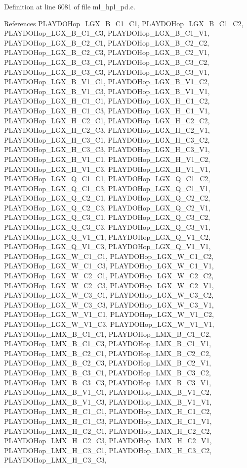 Definition at line 6081 of file ml\_\-hpl\_\-pd.c.

References PLAYDOHop\_\-LGX\_\-B\_\-C1\_\-C1, PLAYDOHop\_\-LGX\_\-B\_\-C1\_\-C2, PLAYDOHop\_\-LGX\_\-B\_\-C1\_\-C3, PLAYDOHop\_\-LGX\_\-B\_\-C1\_\-V1, PLAYDOHop\_\-LGX\_\-B\_\-C2\_\-C1, PLAYDOHop\_\-LGX\_\-B\_\-C2\_\-C2, PLAYDOHop\_\-LGX\_\-B\_\-C2\_\-C3, PLAYDOHop\_\-LGX\_\-B\_\-C2\_\-V1, PLAYDOHop\_\-LGX\_\-B\_\-C3\_\-C1, PLAYDOHop\_\-LGX\_\-B\_\-C3\_\-C2, PLAYDOHop\_\-LGX\_\-B\_\-C3\_\-C3, PLAYDOHop\_\-LGX\_\-B\_\-C3\_\-V1, PLAYDOHop\_\-LGX\_\-B\_\-V1\_\-C1, PLAYDOHop\_\-LGX\_\-B\_\-V1\_\-C2, PLAYDOHop\_\-LGX\_\-B\_\-V1\_\-C3, PLAYDOHop\_\-LGX\_\-B\_\-V1\_\-V1, PLAYDOHop\_\-LGX\_\-H\_\-C1\_\-C1, PLAYDOHop\_\-LGX\_\-H\_\-C1\_\-C2, PLAYDOHop\_\-LGX\_\-H\_\-C1\_\-C3, PLAYDOHop\_\-LGX\_\-H\_\-C1\_\-V1, PLAYDOHop\_\-LGX\_\-H\_\-C2\_\-C1, PLAYDOHop\_\-LGX\_\-H\_\-C2\_\-C2, PLAYDOHop\_\-LGX\_\-H\_\-C2\_\-C3, PLAYDOHop\_\-LGX\_\-H\_\-C2\_\-V1, PLAYDOHop\_\-LGX\_\-H\_\-C3\_\-C1, PLAYDOHop\_\-LGX\_\-H\_\-C3\_\-C2, PLAYDOHop\_\-LGX\_\-H\_\-C3\_\-C3, PLAYDOHop\_\-LGX\_\-H\_\-C3\_\-V1, PLAYDOHop\_\-LGX\_\-H\_\-V1\_\-C1, PLAYDOHop\_\-LGX\_\-H\_\-V1\_\-C2, PLAYDOHop\_\-LGX\_\-H\_\-V1\_\-C3, PLAYDOHop\_\-LGX\_\-H\_\-V1\_\-V1, PLAYDOHop\_\-LGX\_\-Q\_\-C1\_\-C1, PLAYDOHop\_\-LGX\_\-Q\_\-C1\_\-C2, PLAYDOHop\_\-LGX\_\-Q\_\-C1\_\-C3, PLAYDOHop\_\-LGX\_\-Q\_\-C1\_\-V1, PLAYDOHop\_\-LGX\_\-Q\_\-C2\_\-C1, PLAYDOHop\_\-LGX\_\-Q\_\-C2\_\-C2, PLAYDOHop\_\-LGX\_\-Q\_\-C2\_\-C3, PLAYDOHop\_\-LGX\_\-Q\_\-C2\_\-V1, PLAYDOHop\_\-LGX\_\-Q\_\-C3\_\-C1, PLAYDOHop\_\-LGX\_\-Q\_\-C3\_\-C2, PLAYDOHop\_\-LGX\_\-Q\_\-C3\_\-C3, PLAYDOHop\_\-LGX\_\-Q\_\-C3\_\-V1, PLAYDOHop\_\-LGX\_\-Q\_\-V1\_\-C1, PLAYDOHop\_\-LGX\_\-Q\_\-V1\_\-C2, PLAYDOHop\_\-LGX\_\-Q\_\-V1\_\-C3, PLAYDOHop\_\-LGX\_\-Q\_\-V1\_\-V1, PLAYDOHop\_\-LGX\_\-W\_\-C1\_\-C1, PLAYDOHop\_\-LGX\_\-W\_\-C1\_\-C2, PLAYDOHop\_\-LGX\_\-W\_\-C1\_\-C3, PLAYDOHop\_\-LGX\_\-W\_\-C1\_\-V1, PLAYDOHop\_\-LGX\_\-W\_\-C2\_\-C1, PLAYDOHop\_\-LGX\_\-W\_\-C2\_\-C2, PLAYDOHop\_\-LGX\_\-W\_\-C2\_\-C3, PLAYDOHop\_\-LGX\_\-W\_\-C2\_\-V1, PLAYDOHop\_\-LGX\_\-W\_\-C3\_\-C1, PLAYDOHop\_\-LGX\_\-W\_\-C3\_\-C2, PLAYDOHop\_\-LGX\_\-W\_\-C3\_\-C3, PLAYDOHop\_\-LGX\_\-W\_\-C3\_\-V1, PLAYDOHop\_\-LGX\_\-W\_\-V1\_\-C1, PLAYDOHop\_\-LGX\_\-W\_\-V1\_\-C2, PLAYDOHop\_\-LGX\_\-W\_\-V1\_\-C3, PLAYDOHop\_\-LGX\_\-W\_\-V1\_\-V1, PLAYDOHop\_\-LMX\_\-B\_\-C1\_\-C1, PLAYDOHop\_\-LMX\_\-B\_\-C1\_\-C2, PLAYDOHop\_\-LMX\_\-B\_\-C1\_\-C3, PLAYDOHop\_\-LMX\_\-B\_\-C1\_\-V1, PLAYDOHop\_\-LMX\_\-B\_\-C2\_\-C1, PLAYDOHop\_\-LMX\_\-B\_\-C2\_\-C2, PLAYDOHop\_\-LMX\_\-B\_\-C2\_\-C3, PLAYDOHop\_\-LMX\_\-B\_\-C2\_\-V1, PLAYDOHop\_\-LMX\_\-B\_\-C3\_\-C1, PLAYDOHop\_\-LMX\_\-B\_\-C3\_\-C2, PLAYDOHop\_\-LMX\_\-B\_\-C3\_\-C3, PLAYDOHop\_\-LMX\_\-B\_\-C3\_\-V1, PLAYDOHop\_\-LMX\_\-B\_\-V1\_\-C1, PLAYDOHop\_\-LMX\_\-B\_\-V1\_\-C2, PLAYDOHop\_\-LMX\_\-B\_\-V1\_\-C3, PLAYDOHop\_\-LMX\_\-B\_\-V1\_\-V1, PLAYDOHop\_\-LMX\_\-H\_\-C1\_\-C1, PLAYDOHop\_\-LMX\_\-H\_\-C1\_\-C2, PLAYDOHop\_\-LMX\_\-H\_\-C1\_\-C3, PLAYDOHop\_\-LMX\_\-H\_\-C1\_\-V1, PLAYDOHop\_\-LMX\_\-H\_\-C2\_\-C1, PLAYDOHop\_\-LMX\_\-H\_\-C2\_\-C2, PLAYDOHop\_\-LMX\_\-H\_\-C2\_\-C3, PLAYDOHop\_\-LMX\_\-H\_\-C2\_\-V1, PLAYDOHop\_\-LMX\_\-H\_\-C3\_\-C1, PLAYDOHop\_\-LMX\_\-H\_\-C3\_\-C2, PLAYDOHop\_\-LMX\_\-H\_\-C3\_\-C3, 